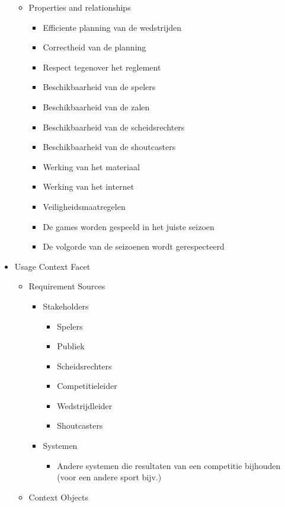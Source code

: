 \documentclass[12pt,a4paper]{article}
\begin{document}
\begin{itemize}
\begin{itemize}
				\item Properties and relationships
				\begin{itemize}
					\item Efficiente planning van de wedstrijden
					\item Correctheid van de planning
					\item Respect tegenover het reglement
					\item Beschikbaarheid van de spelers
					\item Beschikbaarheid van de zalen
					\item Beschikbaarheid van de scheidsrechters
					\item Beschikbaarheid van de shoutcasters
					\item Werking van het materiaal
					\item Werking van het internet
					\item Veiligheidsmaatregelen
					\item De games worden gespeeld in het juiste seizoen
					\item De volgorde van de seizoenen wordt gerespecteerd
				\end{itemize}
			\end{itemize}
			\item Usage Context Facet
			\begin{itemize}
				\item Requirement Sources
				\begin{itemize}
					\item Stakeholders
					\begin{itemize}
						\item Spelers
						\item Publiek
						\item Scheidsrechters
						\item Competitieleider
						\item Wedstrijdleider
						\item Shoutcasters
					\end{itemize}
					\item Systemen
					\begin{itemize}
						\item Andere systemen die resultaten van een competitie bijhouden (voor een andere sport bijv.)
					\end{itemize}
				\end{itemize}
				\item Context Objects
				\begin{itemize}

\end{itemize}
\end{itemize}
\end{itemize}
\end{document}
